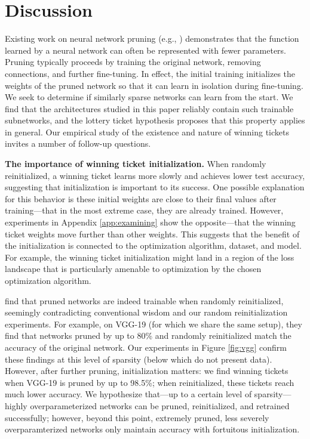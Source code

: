 \section{Discussion}

Existing work on neural network pruning (e.g., \citet{han-pruning}) demonstrates that the function
learned by a neural network can often be represented with fewer parameters. Pruning typically proceeds by training the original network, removing connections, and further fine-tuning. 
In effect, the initial training initializes the weights of the
pruned network so that it can learn in isolation during fine-tuning.  
We seek to determine if similarly sparse networks can learn from the
start.
We find that the architectures studied in this paper reliably contain such trainable subnetworks, and the lottery ticket hypothesis proposes that this property applies in general.
Our empirical study of the existence and nature of winning tickets invites a number of follow-up questions.


\textbf{The importance of winning ticket initialization.}
When randomly reinitialized, a winning ticket learns more slowly and achieves lower test accuracy, suggesting
that initialization is important to its success. One
possible explanation for this behavior is these initial weights are close to their
final values after training---that in the most extreme case, they are already trained. However,
experiments in Appendix \ref{app:examining} show the opposite---that
the winning ticket weights move further
 than
other weights.  This suggests that the benefit of the initialization is connected
to the optimization algorithm, dataset, and model. For example,
the winning ticket initialization might land in a region of the loss landscape
that is particularly amenable to optimization by the chosen optimization algorithm.

\citet{rethinking-pruning} find that pruned networks are indeed trainable when randomly reinitialized,
seemingly contradicting conventional wisdom and our random reinitialization experiments.
For example, on VGG-19 (for which we share the same setup),
they find that networks pruned by up to 80\% and randomly reinitialized match the accuracy of the original network.
Our experiments in Figure \ref{fig:vgg} confirm these findings at this level of sparsity  (below which \citeauthor{rethinking-pruning} do not present data). However, after further pruning, initialization matters:
we find winning tickets when VGG-19 is pruned by up to 98.5\%; when reinitialized, these tickets reach much lower accuracy.
We hypothesize that---up to a certain level of sparsity---highly overparameterized networks can be pruned, reinitialized, and retrained successfully; however, beyond this point, extremely pruned, less severely overparamterized networks only maintain
accuracy with fortuitous initialization.

